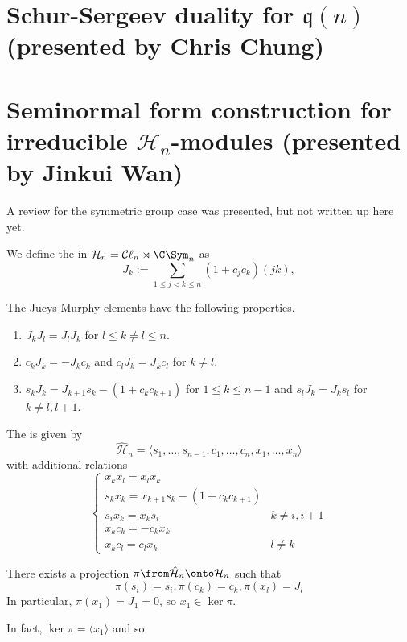 \documentclass[11pt,leqno,oneside]{amsbook}
\renewcommand{\H}{\mathcal{H}}
\newcommand{\Cl}{\mathcal{C\ell}} %
\renewcommand{\q}{\mathfrak{q}}
\numberwithin{thm}{section}
\begin{document}
\section{Schur-Sergeev duality for \(\q(n)\) (presented by Chris Chung)}
\section{Seminormal form construction for irreducible \(\H_n\)-modules
  (presented by Jinkui Wan)}
A review for the symmetric group case was presented, but not written
up here yet.
\begin{defn}
  We define the  in \(\H_n = \Cl_n \rtimes
  \C\Sym_n\) as \[
    J_k := \sum_{1 \leq j < k \leq n} (1+c_j c_k) (jk), 
  \]
\end{defn}
\begin{prop}
  The Jucys-Murphy elements have the following properties.
  \begin{enumerate}
  \item \(J_k J_l = J_l J_k\) for \(l \leq k \neq l \leq n\).
  \item \(c_k J_k = -J_k c_k\) and \(c_l J_k = J_k c_l\) for \(k \neq
    l\).
  \item \(s_k J_k = J_{k+1}s_k - (1+c_k c_{k+1})\) for \(1 \leq k \leq
    n-1\) and \(s_l J_k = J_k s_l\) for \(k \neq l,l+1\).
  \end{enumerate}
\end{prop}
\begin{defn}
  The  is given by \[
    \hat{\H}_n = \langle s_1, \ldots, s_{n-1}, c_1, \ldots, c_n, x_1
    ,\ldots, x_n\rangle
  \]
  with additional relations \[
    \begin{cases}
      x_k x_l = x_l x_k\\
      s_k x_k = x_{k+1} s_k - (1+c_k c_{k+1})\\
      s_i x_k = x_k s_i & k \neq i,i+1\\
      x_k c_k = - c_k x_k \\
      x_k c_l = c_l x_k & l \neq k
    \end{cases}
  \]
\end{defn}
\begin{prop}
  There exists a projection \(\pi \from \hat{\H}_n \onto \H_n\) such
  that \[
    \pi(s_i) = s_i, \pi(c_k) = c_k, \pi(x_l) = J_l
  \]
  In particular, \(\pi(x_1) = J_1 = 0\), so \(x_1 \in \ker \pi\). 
\end{prop}
In fact, \(\ker \pi = \langle x_1 \rangle\) and so
\end{document}

